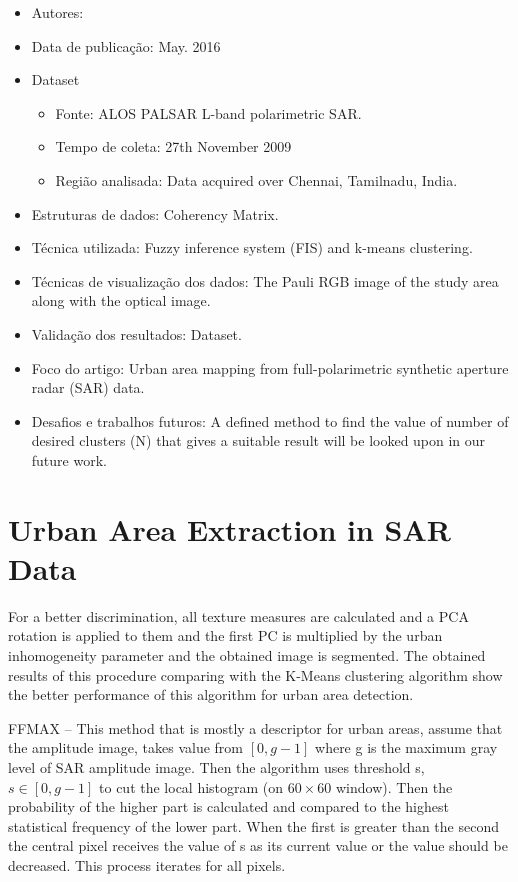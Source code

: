 \documentclass[paper=a4, fontsize=11pt]{scrartcl}
\begin{document}
\begin{itemize}
    \item Autores:~\cite{ahluwalia2016urban}
    \item Data de publicação: May. 2016
    \item Dataset
    \begin{itemize}
        \item Fonte: ALOS PALSAR L-band polarimetric SAR.
        \item Tempo de coleta: 27th November 2009
        \item Região analisada: Data acquired over Chennai, Tamilnadu, India.
    \end{itemize}
    \item Estruturas de dados: Coherency Matrix.
    \item Técnica utilizada: Fuzzy inference system (FIS) and k-means clustering.
    \item Técnicas de visualização dos dados: The Pauli RGB image of the study area along with the optical image.
    \item Validação dos resultados: Dataset.
    \item Foco do artigo: Urban area mapping from full-polarimetric synthetic aperture radar (SAR) data.
    \item Desafios e trabalhos futuros: A defined method to find the value of number of desired clusters (N) that gives a suitable result will be looked upon in our future work.
\end{itemize}

\newpage

\section*{Urban Area Extraction in SAR Data}

For a better discrimination, all texture measures are calculated and a PCA rotation is applied to them and the first PC is multiplied by the urban inhomogeneity parameter and the obtained image is segmented. 
The obtained results of this procedure comparing with the K-Means clustering algorithm show the better performance of this algorithm for urban area detection.

FFMAX -- This method that is mostly a descriptor for urban areas, assume that the amplitude image, takes value from $[0, g-1]$ where g is the maximum gray level of SAR amplitude image.
Then the algorithm uses threshold s, $s \in [0, g- 1]$ to cut the local histogram (on $60 \times 60$ window). 
Then the probability of the higher part is calculated and compared to the highest statistical frequency of the lower part.
When the first is greater than the second the central pixel receives the value of s as its current value or the value should be decreased.
This process iterates for all pixels.
\end{document}
